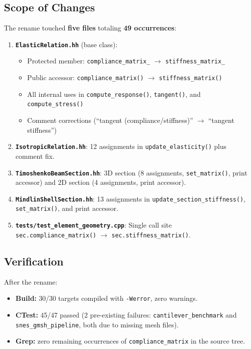\subsection{Scope of Changes}

The rename touched \textbf{five files} totaling \textbf{49 occurrences}:

\begin{enumerate}
  \item \textbf{\texttt{ElasticRelation.hh}} (base class):
    \begin{itemize}
      \item Protected member: \texttt{compliance\_matrix\_} $\to$ \texttt{stiffness\_matrix\_}
      \item Public accessor: \texttt{compliance\_matrix()} $\to$ \texttt{stiffness\_matrix()}
      \item All internal uses in \texttt{compute\_response()}, \texttt{tangent()},
            and \texttt{compute\_stress()}
      \item Comment corrections (``tangent (compliance/stiffness)'' $\to$ ``tangent stiffness'')
    \end{itemize}

  \item \textbf{\texttt{IsotropicRelation.hh}}:
    12 assignments in \texttt{update\_elasticity()} plus comment fix.

  \item \textbf{\texttt{TimoshenkoBeamSection.hh}}:
    3D section (8 assignments, \texttt{set\_matrix()}, print accessor)
    and 2D section (4 assignments, print accessor).

  \item \textbf{\texttt{MindlinShellSection.hh}}:
    13 assignments in \texttt{update\_section\_stiffness()},
    \texttt{set\_matrix()}, and print accessor.

  \item \textbf{\texttt{tests/test\_element\_geometry.cpp}}:
    Single call site \texttt{sec.compliance\_matrix()} $\to$
    \texttt{sec.stiffness\_matrix()}.
\end{enumerate}

\subsection{Verification}

After the rename:
\begin{itemize}
  \item \textbf{Build:} 30/30 targets compiled with \texttt{-Werror}, zero warnings.
  \item \textbf{CTest:} 45/47 passed (2 pre-existing failures:
        \texttt{cantilever\_benchmark} and \texttt{snes\_gmsh\_pipeline},
        both due to missing mesh files).
  \item \textbf{Grep:} zero remaining occurrences of
        \texttt{compliance\_matrix} in the source tree.
\end{itemize}


